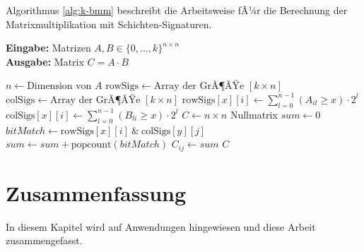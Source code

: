 ﻿\documentclass[a4paper,12pt]{article}
\theoremstyle{definition}
\begin{document}
Algorithmus \ref*{alg:k-bmm} beschreibt die Arbeitsweise fÃ¼r die Berechnung der Matrixmultiplikation mit Schichten-Signaturen.
\begin{algorithm}[H]
	\caption{BeschrÃ¤nkte Matrixmultiplikation mit Schichten-Signaturen}
	\label{alg:k-bmm}
	\textbf{Eingabe:} Matrizen $A, B \in \{0,\dots,k\}^{n \times n}$ \\
	\textbf{Ausgabe:} Matrix $C = A \cdot B$
	\begin{algorithmic}[1]
		\State $n \gets \text{Dimension von } A$
		\State $\text{rowSigs} \gets \text{Array der GrÃ¶ÃŸe } [k \times n]$
		\State $\text{colSigs} \gets \text{Array der GrÃ¶ÃŸe } [k \times n]$
		\State $\text{rowSigs}[x][i] \gets \sum_{l=0}^{n-1} (A_{il} \geq x) \cdot 2^l$ 
		\State $\text{colSigs}[x][i] \gets \sum_{l=0}^{n-1} (B_{li} \geq x) \cdot 2^l$ 
		\EndFor
		\EndFor
		\State $C \gets n \times n$ Nullmatrix
		\State $sum \gets 0$
		\State $bitMatch \gets \text{rowSigs}[x][i] \ \& \ \text{colSigs}[y][j]$
		\State $sum \gets sum + \text{popcount}(bitMatch)$ 
		\EndFor
		\EndFor
		\State $C_{ij} \gets sum$
		\EndFor
		\EndFor    
		\State \Return $C$
	\end{algorithmic}
\end{algorithm}

\section{Zusammenfassung}
In diesem Kapitel wird auf Anwendungen hingewiesen und diese Arbeit zusammengefasst.
\end{document}
